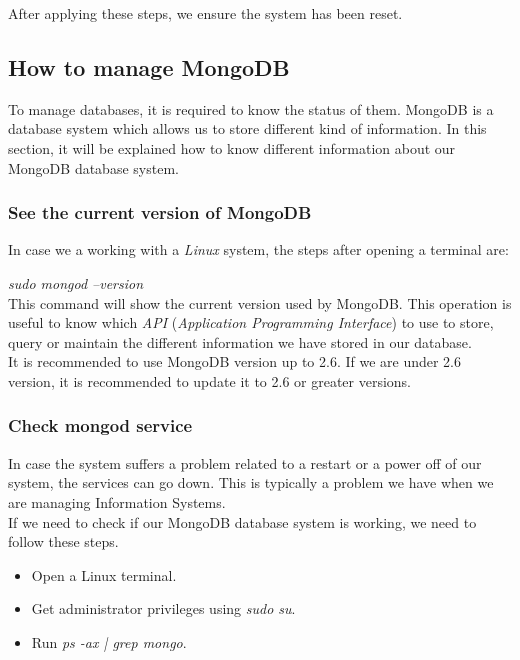 After applying these steps, we ensure the system has been reset.\\

\subsection{How to manage MongoDB}

To manage databases, it is required to know the status of them. MongoDB is a database system which allows us to store different kind of information. In this section, it will be explained how to know different information about our MongoDB database system.

\subsubsection{See the current version of MongoDB}

In case we a working with a \textit{Linux} system, the steps after opening a terminal are:

\textit{sudo mongod –version}\\

This command will show the current version used by MongoDB. This operation is useful to know which \textit{API}\cite{what_is_an_API} (\textit{Application Programming Interface}) to use to store, query or maintain the different information we have stored in our database.\\

It is recommended to use MongoDB version up to 2.6. If we are under 2.6 version, it is recommended to update it to 2.6 or greater versions.

\subsubsection{Check mongod service}

In case the system suffers a problem related to a restart or a power off of our system, the services can go down. This is typically a problem we have when we are managing Information Systems.\\

If we need to check if our MongoDB database system is working, we need to follow these steps.

\begin{itemize}
\item Open a Linux terminal.
\item Get administrator privileges using \textit{sudo su}.
\item Run \textit{ps -ax | grep mongo}.
\end{itemize}

